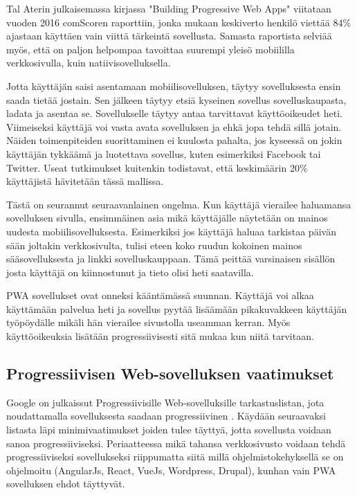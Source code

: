 \documentclass{tktltiki}
\begin{document}
Tal Aterin julkaisemassa kirjassa "Building Progressive Web Apps" \cite{ater2017building} viitataan vuoden 2016 comScoren raporttiin, jonka mukaan keskiverto henkilö viettää 84\% ajastaan käyttäen vain viittä tärkeintä sovellusta. Samasta raportista selviää myös, että on paljon helpompaa tavoittaa suurempi yleisö mobiililla verkkosivulla, kuin natiivisovelluksella. 

Jotta käyttäjän saisi asentamaan mobiilisovelluksen, täytyy sovelluksesta ensin saada tietää jostain. Sen jälkeen täytyy etsiä kyseinen sovellus sovelluskaupasta, ladata ja asentaa se. Sovellukselle täytyy antaa tarvittavat käyttöoikeudet heti. Viimeiseksi käyttäjä voi vasta avata sovelluksen ja ehkä jopa tehdä sillä jotain. Näiden toimenpiteiden suorittaminen ei kuulosta pahalta, jos kyseessä on jokin käyttäjän tykkäämä ja luotettava sovellus, kuten esimerkiksi Facebook tai Twitter. Useat tutkimukset kuitenkin todistavat, että keskimäärin 20\% käyttäjistä hävitetään tässä mallissa. 

Tästä on seurannut seuraavanlainen ongelma. Kun käyttäjä vierailee haluamansa sovelluksen sivulla, ensimmäinen asia mikä käyttäjälle näytetään on mainos uudesta mobiilisovelluksesta. Esimerkiksi jos käyttäjä haluaa tarkistaa päivän sään joltakin verkkosivulta, tulisi eteen koko ruudun kokoinen mainos sääsovelluksesta ja linkki sovelluskauppaan. Tämä peittää varsinaisen sisällön josta käyttäjä on kiinnostunut ja tieto olisi heti saatavilla. 

PWA sovellukset ovat onneksi kääntämässä suunnan. Käyttäjä voi alkaa käyttämään palvelua heti ja sovellus pyytää lisäämään pikakuvakkeen käyttäjän työpöydälle mikäli hän vierailee sivustolla useamman kerran. Myös käyttöoikeuksia lisätään progressiivisesti sitä mukaa kun niitä tarvitaan. 

\subsection{Progressiivisen Web-sovelluksen vaatimukset}

Google on julkaissut Progressiivisille Web-sovelluksille tarkastuslistan, jota noudattamalla sovelluksesta saadaan progressiivinen \cite{Google}. Käydään seuraavaksi listasta läpi minimivaatimukset joiden tulee täyttyä, jotta sovellusta voidaan sanoa progressiiviseksi. Periaatteessa mikä tahansa verkkosivusto voidaan tehdä progressiiviseksi sovellukseksi \cite{hiltunen2018creating} riippumatta siitä millä ohjelmistokehyksellä se on ohjelmoitu (AngularJs, React, VueJs, Wordpress, Drupal), kunhan vain PWA sovelluksen ehdot täyttyvät.
\end{document}
